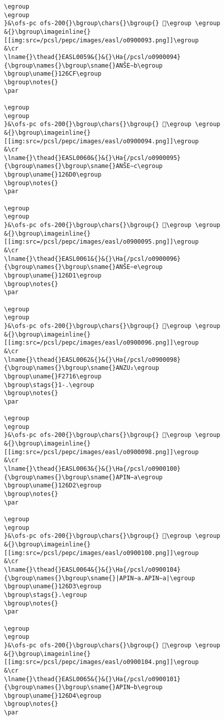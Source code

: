 \begin{verbatim}
\egroup
\egroup
}&\ofs-pc ofs-200{}\bgroup\chars{}\bgroup{} 𒛎\egroup \egroup
&{}\bgroup\imageinline{}[[img:src=/pcsl/pepc/images/easl/o0900093.png]]\egroup
&\cr
\lname{}\thead{}EASL0059&{}&{}\Ha{/pcsl/o0900094}{\bgroup\names{}\bgroup\sname{}ANŠE∼b\egroup
\bgroup\uname{}126CF\egroup
\bgroup\notes{}
\par 

\egroup
\egroup
}&\ofs-pc ofs-200{}\bgroup\chars{}\bgroup{} 𒛏\egroup \egroup
&{}\bgroup\imageinline{}[[img:src=/pcsl/pepc/images/easl/o0900094.png]]\egroup
&\cr
\lname{}\thead{}EASL0060&{}&{}\Ha{/pcsl/o0900095}{\bgroup\names{}\bgroup\sname{}ANŠE∼c\egroup
\bgroup\uname{}126D0\egroup
\bgroup\notes{}
\par 

\egroup
\egroup
}&\ofs-pc ofs-200{}\bgroup\chars{}\bgroup{} 𒛐\egroup \egroup
&{}\bgroup\imageinline{}[[img:src=/pcsl/pepc/images/easl/o0900095.png]]\egroup
&\cr
\lname{}\thead{}EASL0061&{}&{}\Ha{/pcsl/o0900096}{\bgroup\names{}\bgroup\sname{}ANŠE∼e\egroup
\bgroup\uname{}126D1\egroup
\bgroup\notes{}
\par 

\egroup
\egroup
}&\ofs-pc ofs-200{}\bgroup\chars{}\bgroup{} 𒛑\egroup \egroup
&{}\bgroup\imageinline{}[[img:src=/pcsl/pepc/images/easl/o0900096.png]]\egroup
&\cr
\lname{}\thead{}EASL0062&{}&{}\Ha{/pcsl/o0900098}{\bgroup\names{}\bgroup\sname{}ANZU₂\egroup
\bgroup\uname{}F2716\egroup
\bgroup\stags{}1-.\egroup
\bgroup\notes{}
\par 

\egroup
\egroup
}&\ofs-pc ofs-200{}\bgroup\chars{}\bgroup{} 󲜖\egroup \egroup
&{}\bgroup\imageinline{}[[img:src=/pcsl/pepc/images/easl/o0900098.png]]\egroup
&\cr
\lname{}\thead{}EASL0063&{}&{}\Ha{/pcsl/o0900100}{\bgroup\names{}\bgroup\sname{}APIN∼a\egroup
\bgroup\uname{}126D2\egroup
\bgroup\notes{}
\par 

\egroup
\egroup
}&\ofs-pc ofs-200{}\bgroup\chars{}\bgroup{} 𒛒\egroup \egroup
&{}\bgroup\imageinline{}[[img:src=/pcsl/pepc/images/easl/o0900100.png]]\egroup
&\cr
\lname{}\thead{}EASL0064&{}&{}\Ha{/pcsl/o0900104}{\bgroup\names{}\bgroup\sname{}|APIN∼a.APIN∼a|\egroup
\bgroup\uname{}126D3\egroup
\bgroup\stags{}.\egroup
\bgroup\notes{}
\par 

\egroup
\egroup
}&\ofs-pc ofs-200{}\bgroup\chars{}\bgroup{} 𒛓\egroup \egroup
&{}\bgroup\imageinline{}[[img:src=/pcsl/pepc/images/easl/o0900104.png]]\egroup
&\cr
\lname{}\thead{}EASL0065&{}&{}\Ha{/pcsl/o0900101}{\bgroup\names{}\bgroup\sname{}APIN∼b\egroup
\bgroup\uname{}126D4\egroup
\bgroup\notes{}
\par 


\end{verbatim}
